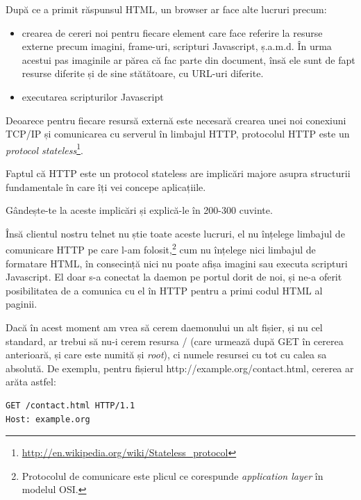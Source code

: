 După ce a primit răspunsul HTML, un browser ar face alte lucruri precum:
\begin{itemize}
\item crearea de cereri noi pentru fiecare element care face referire la resurse
externe precum imagini, frame-uri, scripturi Javascript, ș.a.m.d. În urma 
acestui pas imaginile ar părea că fac parte din document, însă ele sunt de fapt
resurse diferite și de sine stătătoare, cu URL-uri diferite.
\item executarea scripturilor Javascript
\end{itemize}

Deoarece pentru fiecare resursă externă este necesară crearea unei noi conexiuni
TCP/IP și comunicarea cu serverul în limbajul HTTP, protocolul HTTP este
un \textsl{protocol stateless}\footnote{\url{http://en.wikipedia.org/wiki/Stateless\_protocol}}.


\begin{Exercise}[title={HTTP e stateless}]
Faptul că HTTP este un protocol stateless are implicări majore asupra
structurii fundamentale în care îți vei concepe aplicațiile.

Gândește-te la aceste implicări și explică-le în 200-300 cuvinte.
\end{Exercise}

Însă clientul nostru telnet nu știe toate aceste lucruri, el nu înțelege
limbajul de comunicare HTTP pe care l-am folosit,\footnote{Protocolul
de comunicare este {\glqq}plicul{\grqq} ce corespunde \textsl{application layer} în modelul OSI.}
cum nu înțelege nici limbajul
de formatare HTML, în consecință nici nu poate afișa imagini sau executa scripturi Javascript.
El doar s-a conectat la daemon pe portul dorit de noi, și ne-a oferit posibilitatea
de a comunica cu el în HTTP pentru a primi codul HTML al paginii.

Dacă în acest moment am vrea să cerem daemonului un alt fișier, și nu cel standard,
ar trebui să nu-i cerem resursa {\glqq}/{\grqq} (care urmează după {\glqq}GET{\grqq} în cererea anterioară,
și care este numită și \textsl{root}),
ci numele resursei cu tot cu calea sa absolută. De exemplu, pentru fișierul
{\glqq}http://example.org/contact.html{\grqq},
cererea ar arăta astfel:

\begin{verbatim}
GET /contact.html HTTP/1.1
Host: example.org

\end{verbatim}

